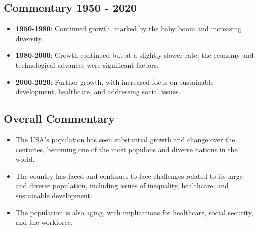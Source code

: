 \subsection*{Commentary 1950 - 2020}
\begin{itemize}
    \item \textbf{1950-1980}: Continued growth, marked by the baby boom and increasing diversity.
    \item \textbf{1980-2000}: Growth continued but at a slightly slower rate; the economy and technological advances were significant factors.
    \item \textbf{2000-2020}: Further growth, with increased focus on sustainable development, healthcare, and addressing social issues.
\end{itemize}

\subsection*{Overall Commentary}
\begin{itemize}
    \item The USA’s population has seen substantial growth and change over the centuries, becoming one of the most populous and diverse nations in the world.
    \item The country has faced and continues to face challenges related to its large and diverse population, including issues of inequality, healthcare, and sustainable development.
    \item The population is also aging, with implications for healthcare, social security, and the workforce.
\end{itemize}

